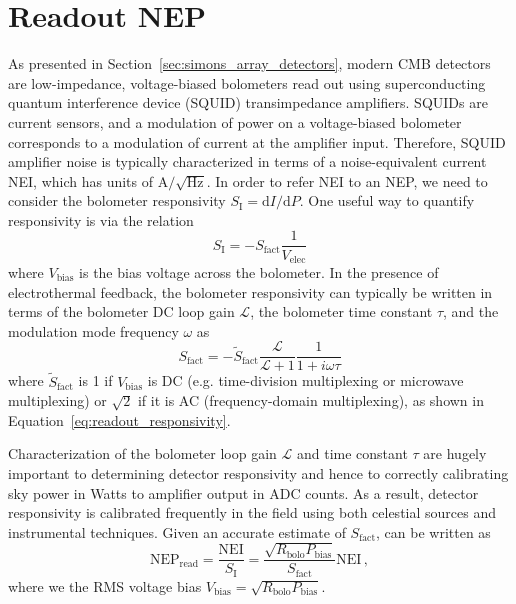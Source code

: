\section{Readout NEP}
\label{sec:sensitivity_readout_noise}

As presented in Section~\ref{sec:simons_array_detectors}, modern CMB detectors are low-impedance, voltage-biased bolometers read out using superconducting quantum interference device (SQUID) transimpedance amplifiers. SQUIDs are current sensors, and a modulation of power on a voltage-biased bolometer corresponds to a modulation of current at the amplifier input. Therefore, SQUID amplifier noise is typically characterized in terms of a noise-equivalent current NEI, which has units of $\mathrm{A /\sqrt{Hz}}$. In order to refer NEI to an NEP, we need to consider the bolometer responsivity $S_{\mathrm{I}} = \mathrm{d} I / \mathrm{d} P$. One useful way to quantify responsivity is via the relation
\begin{equation}
    S_{\mathrm{I}} = -S_{\mathrm{fact}} \frac{1}{V_{\mathrm{elec}}}
    \label{eq:approx_responsivity}
\end{equation}
where $V_{\mathrm{bias}}$ is the bias voltage across the bolometer. In the presence of electrothermal feedback, the bolometer responsivity can typically be written in terms of the bolometer DC loop gain $\mathcal{L}$, the bolometer time constant $\tau$, and the modulation mode frequency $\omega$ as
\begin{equation}
    S_{\mathrm{fact}} = -\tilde{S}_{\mathrm{fact}} \frac{\mathcal{L}}{\mathcal{L} + 1} \frac{1}{1 + i \omega \tau}
    \label{eq:responsivity}
\end{equation}
where $\tilde{S}_{\mathrm{fact}}$ is 1 if $V_{\mathrm{bias}}$ is DC (e.g. time-division multiplexing or microwave multiplexing) or $\sqrt{2}$ if it is AC (frequency-domain multiplexing), as shown in Equation~\ref{eq:readout_responsivity}.

Characterization of the bolometer loop gain $\mathcal{L}$ and time constant $\tau$ are hugely important to determining detector responsivity and hence to correctly calibrating sky power in Watts to amplifier output in ADC counts. As a result, detector responsivity is calibrated frequently in the field using both celestial sources and instrumental techniques. Given an accurate estimate of $S_{\mathrm{fact}}$,  can be written as
\begin{equation}
    \mathrm{NEP}_{\mathrm{read}} = \frac{\mathrm{NEI}}{S_{\mathrm{I}}} = \frac{\sqrt{R_{\mathrm{bolo}} P_{\mathrm{bias}}}}{S_{\mathrm{fact}}} \mathrm{NEI} \, ,
    \label{eq:nep_read}
\end{equation}
where we the RMS voltage bias $V_{\mathrm{bias}} = \sqrt{R_{\mathrm{bolo}} P_{\mathrm{bias}}}$.

